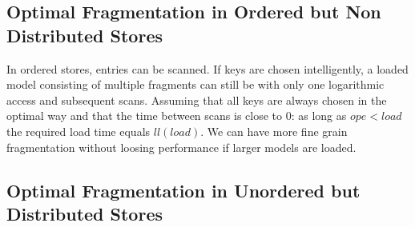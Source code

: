 \subsection{Optimal Fragmentation in Ordered but Non Distributed Stores}

In ordered stores, entries can be scanned. If keys are chosen intelligently, a loaded model consisting of multiple fragments can still be with only one logarithmic access and subsequent scans. Assuming that all keys are always chosen in the optimal way and that the time between scans is close to 0: as long as $ope<load$ the required load time equals $ll(load)$. We can have more fine grain fragmentation without loosing performance if larger models are loaded. 

\subsection{Optimal Fragmentation in Unordered but Distributed Stores}